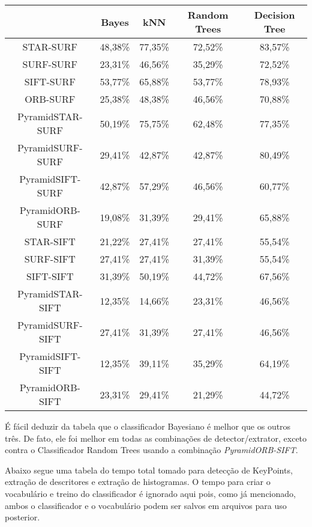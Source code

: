 \documentclass[a4paper,11pt]{article}
\begin{document}
  \hspace{-25pt}
  \begin{tabular}{|c|c|c|c|c|}
    \hline
     & Bayes & kNN & Random Trees & Decision Tree \\
    \hline
        STAR-SURF & 48,38\% & 77,35\% & 72,52\% & 83,57\% \\
        SURF-SURF & 23,31\% & 46,56\% & 35,29\% & 72,52\% \\
        SIFT-SURF & 53,77\% & 65,88\% & 53,77\% & 78,93\%\\
        ORB-SURF & 25,38\% & 48,38\% & 46,56\% & 70,88\% \\
        PyramidSTAR-SURF & 50,19\% & 75,75\% & 62,48\% & 77,35\% \\
        PyramidSURF-SURF & 29,41\% & 42,87\% & 42,87\% & 80,49\% \\
        PyramidSIFT-SURF & 42,87\% & 57,29\% & 46,56\% & 60,77\% \\
        PyramidORB-SURF & 19,08\% & 31,39\% & 29,41\% & 65,88\% \\
        STAR-SIFT & 21,22\% & 27,41\% & 27,41\% & 55,54\% \\
        SURF-SIFT & 27,41\% & 27,41\% & 31,39\% & 55,54\% \\
        SIFT-SIFT & 31,39\% & 50,19\% & 44,72\% & 67,56\% \\
        PyramidSTAR-SIFT & 12,35\% & 14,66\% & 23,31\% & 46,56\% \\
        PyramidSURF-SIFT & 27,41\% & 31,39\% & 27,41\% & 46,56\% \\
        PyramidSIFT-SIFT & 12,35\% & 39,11\% & 35,29\% & 64,19\% \\
        PyramidORB-SIFT & 23,31\% & 29,41\% & 21,29\% & 44,72\% \\
        
    \hline
  \end{tabular}
  \bigskip

  É fácil deduzir da tabela que o classificador Bayesiano é melhor que os outros
  três. De fato, ele foi melhor em todas as combinações de detector/extrator,
  exceto contra o Classificador Random Trees usando a combinação
  \textit{PyramidORB-SIFT}.

  Abaixo segue uma tabela do tempo total tomado para detecção de KeyPoints,
  extração de descritores e extração de histogramas. O tempo para criar o
  vocabulário e treino do classificador é ignorado aqui pois, como já
  mencionado, ambos o classificador e o vocabulário podem ser salvos em arquivos
  para uso posterior.
\end{document}
